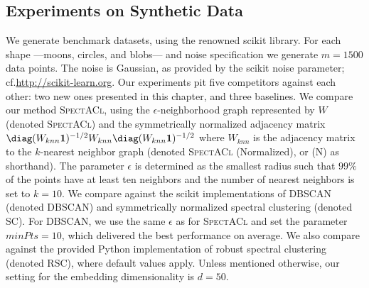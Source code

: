 \subsection{Experiments on Synthetic Data}\label{sec:SA:synthExp}
We generate benchmark datasets, using the renowned scikit library. For each shape ---moons, circles, and blobs--- and noise specification we generate $m=1500$ data points. The noise is Gaussian, as provided by the scikit noise parameter; cf.\@ \url{http://scikit-learn.org}. Our experiments pit five competitors against each other: two new ones presented in this chapter, and three baselines.  
We compare our method \textsc{SpectACl}, using the $\epsilon$-neighborhood graph represented by $W$ (denoted \textsc{SpectACl}) and the symmetrically normalized adjacency matrix $\diag(W_{knn}\mathbf{1})^{-1/2}W_{knn}\diag(W_{knn}\mathbf{1})^{-1/2}$ where $W_{knn}$ is the adjacency matrix to the $k$-nearest neighbor graph (denoted \textsc{SpectACl} (Normalized), or (N) as shorthand). The parameter $\epsilon$ is determined as the smallest radius such that $99\%$ of the points have at least ten neighbors and the number of nearest neighbors is set to $k=10$. We compare against the scikit implementations of DBSCAN (denoted DBSCAN) and symmetrically normalized spectral clustering (denoted \textsc{SC}). For DBSCAN, we use the same $\epsilon$ as for \textsc{SpectACl} and set the parameter $minPts=10$, which delivered the best performance on average. We also compare against the provided Python implementation of robust spectral clustering~\citep{bojchevski2017robust} (denoted \textsc{RSC}), where default values apply. Unless mentioned otherwise, our setting for the embedding dimensionality is $d=50$.
